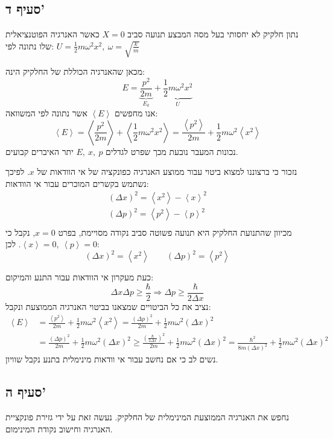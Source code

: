 \documentclass{article}
\newcommand{\angular}[1]{\left\langle{#1}\right\rangle} %
\newcommand{\p}[1]{\left({#1}\right)}                   %
\newcommand{\fra}[2]{\p{\frac{#1}{#2}}}                 %
\newcommand{\n}{\newline}                       %
\newcommand{\vtab}{\vspace{1em}\noindent}       %
\begin{document}
\subsection*{סעיף ד'}
נתון חלקיק לא יחסותי בעל מסה המבצע תנועה סביב $X=0$ כאשר האנרגיה הפוטנציאלית שלו נתונה לפי: $U=\frac{1}{2}m\omega^2 x^2, ~\omega = \sqrt{\frac{k}{m}}$\n

\vtab
מכאן שהאנרגיה הכוללת של החלקיק הינה:
\[
    E = \underbrace{\frac{p^2}{2m}}_{E_k} + \underbrace{\frac{1}{2}m\omega^2 x^2}_{U}
\]
אנו מחפשים $\angular{E}$ אשר נתונה לפי המשוואה:
\[
    \angular{E} = \angular{\frac{p^2}{2m}} + \angular{\frac{1}{2}m\omega^2 x^2} = \frac{\angular{p^2}}{2m} + \frac{1}{2}m\omega^2 \angular{x^2}
\]
נכונות המעבר נובעת מכך שפרט לגדלים $E,~x,~p$ יתר האיברים קבועים.\n

\vtab
נזכור כי ברצוננו למצוא ביטוי עבור ממוצע האנרגיה כפונקציה של אי הוודאות של $x$. לפיכך נשתמש בקשרים המוכרים עבור אי הוודאות:
\begin{gather*}
    \p{\Delta x}^2 = \angular{x^2}-\angular{x}^2 \\
    \p{\Delta p}^2 = \angular{p^2}-\angular{p}^2 \\
\end{gather*}
מכיוון שהתנועת החלקיק היא תנועה פשוטה סביב נקודה מסויימת, בפרט $x=0$, נקבל כי $\angular{x}=0, ~\angular{p}=0$.
לכן:
\[
    \p{\Delta x}^2 = \angular{x^2} \qquad \p{\Delta p}^2 = \angular{p^2}
\]

כעת מעקרון אי הוודאות עבור התנע והמיקום:
\[
    \Delta x \Delta p \ge \frac{\hbar}{2} \Rightarrow \Delta p \ge \frac{\hbar}{2\Delta x}
\]
נציב את כל הביטויים שמצאנו בביטוי האנרגיה הממוצעת ונקבל:
\begin{align*}
    \angular{E} &= \frac{\angular{p^2}}{2m} + \frac{1}{2}m\omega^2 \angular{x^2} = \frac{\p{\Delta p}^2}{2m} + \frac{1}{2}m\omega^2 \p{\Delta x}^2 \\
    & = \frac{\p{\Delta p}^2}{2m} + \frac{1}{2}m\omega^2 \p{\Delta x}^2 \ge \frac{\fra{\hbar}{2\Delta x}^2}{2m} + \frac{1}{2}m\omega^2 \p{\Delta x}^2 =
    \boxed{\frac{\hbar^2}{8m\p{\Delta x}^2} + \frac{1}{2}m\omega^2 \p{\Delta x}^2}
\end{align*}
נשים לב כי אם נחשב עבור אי וודאות מינימלית בתנע נקבל שוויון.

\subsection*{סעיף ה'}
נחפש את האנרגיה הממוצעת המינימלית של החלקיק. נעשה זאת על ידי גזירת פונקציית האנרגיה וחישוב נקודת המינימום. \n
\end{document}
